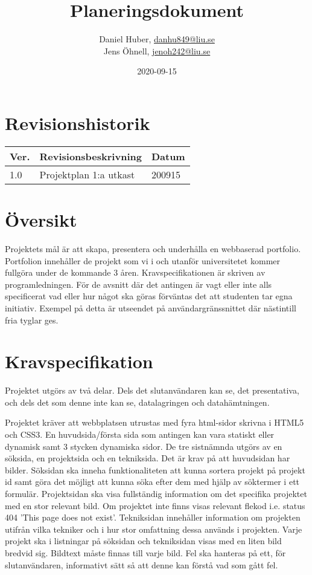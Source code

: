 \documentclass{TDP003mall}
\author{Daniel Huber, \url{danhu849@liu.se}\\
  Jens Öhnell, \url{jenoh242@liu.se}}
\title{Planeringsdokument}
\date{2020-09-15}
\begin{document}
\projectpage
\section{Revisionshistorik}
\begin{table}[!h]
\begin{tabularx}{\linewidth}{|l|X|l|}
\hline
Ver. & Revisionsbeskrivning & Datum \\\hline
1.0 & Projektplan 1:a utkast & 200915 \\\hline
\end{tabularx}
\end{table}


\section{Översikt}
Projektets mål är att skapa, presentera och underhålla en webbaserad portfolio. Portfolion innehåller de projekt som vi i och utanför universitetet kommer fullgöra under de kommande 3 åren. Kravspecifikationen är skriven av programledningen. För de avsnitt där det antingen är vagt eller inte alls specificerat vad eller hur något ska göras förväntas det att studenten tar egna initiativ. Exempel på detta är utseendet på användargränssnittet där nästintill fria tyglar ges.


\section{Kravspecifikation}
Projektet utgörs av två delar. Dels det slutanvändaren kan se, det presentativa, och dels det som denne inte kan se, datalagringen och datahämtningen.

Projektet kräver att webbplatsen utrustas med fyra html-sidor skrivna i HTML5 och CSS3. En huvudsida/första sida som antingen kan vara statiskt eller dynamisk samt 3 stycken dynamiska sidor. De tre sistnämnda utgörs av en söksida, en projektsida och en tekniksida. Det är krav på att huvudsidan har bilder. Söksidan ska inneha funktionaliteten att kunna sortera projekt på projekt id samt göra det möjligt att kunna söka efter dem med hjälp av söktermer i ett formulär. Projektsidan ska visa fullständig information om det specifika projektet med en stor relevant bild. Om projektet inte finns visas relevant flekod i.e. status 404 'This page does not exist'. Tekniksidan innehåller information om projekten utifrån vilka tekniker och i hur stor omfattning dessa används i projekten. Varje projekt ska i listningar på söksidan och tekniksidan visas med en liten bild bredvid sig. Bildtext måste finnas till varje bild. Fel ska hanteras på ett, för slutanvändaren, informativt sätt så att denne kan förstå vad som gått fel.
\end{document}
